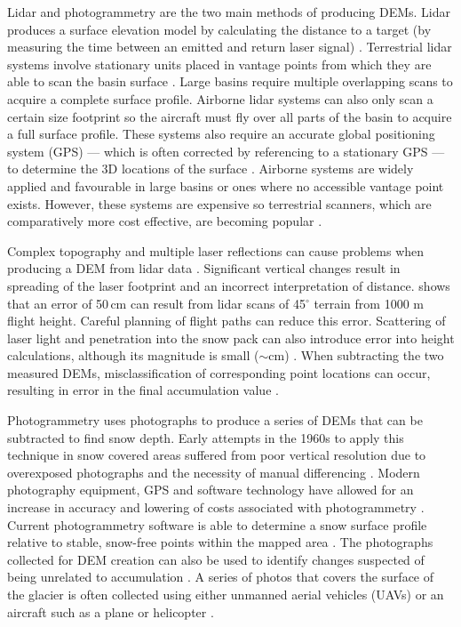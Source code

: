 \documentclass{sfuthesis}
\begin{document}
\begin{appendices}
Lidar and photogrammetry are the two main methods of producing DEMs. Lidar produces a surface elevation model by calculating the distance to a target (by measuring the time between an emitted and return laser signal) \citep{Deems2006, Sold2013}. Terrestrial lidar systems involve stationary units placed in vantage points from which they are able to scan the basin surface \citep{Grunewald2010}. Large basins require multiple overlapping scans to acquire a complete surface profile. Airborne lidar systems can also only scan a certain size footprint so the aircraft must fly over all parts of the basin to acquire a full surface profile. These systems also require an accurate global positioning system (GPS) --- which is often corrected by referencing to a stationary GPS --- to determine the 3D locations of the surface \citep{Deems2006}. Airborne systems are widely applied and favourable in large basins or ones where no accessible vantage point exists. However, these systems are expensive so terrestrial scanners, which are comparatively more cost effective, are becoming popular \citep{Grunewald2010}. 

Complex topography and multiple laser reflections can cause problems when producing a DEM from lidar data \citep{Deems2006}. Significant vertical changes result in spreading of the laser footprint and an incorrect interpretation of distance. \cite{Deems2006} shows that an error of 50\,cm can result from lidar scans of 45$^\circ$ terrain from 1000 m flight height. Careful planning of flight paths can reduce this error. Scattering of laser light and penetration into the snow pack can also introduce error into height calculations, although its magnitude is small ($\sim$cm) \citep{Deems2006}. When subtracting the two measured DEMs, misclassification of corresponding point locations can occur, resulting in error in the final accumulation value \citep{Deems2006}.  

Photogrammetry uses photographs to produce a series of DEMs that can be subtracted to find snow depth. Early attempts in the 1960s to apply this technique in snow covered areas suffered from poor vertical resolution due to overexposed photographs and the necessity of manual differencing \citep{Nolan2015}. Modern photography equipment, GPS and software technology have allowed for an increase in accuracy and lowering of costs associated with photogrammetry \citep{Nolan2015}. Current photogrammetry software is able to determine a snow surface profile relative to stable, snow-free points within the mapped area \citep{Farinotti2010}. The photographs collected for DEM creation can also be used to identify changes suspected of being unrelated to accumulation \citep{Nolan2015}. A series of photos that covers the surface of the glacier is often collected using either unmanned aerial vehicles (UAVs) \citep[e.g.][]{Buhler2015,Jagt2015,Harder2016} or an aircraft such as a plane or helicopter \citep[e.g.][]{Nolan2015}. 


\end{appendices}
\end{document}
